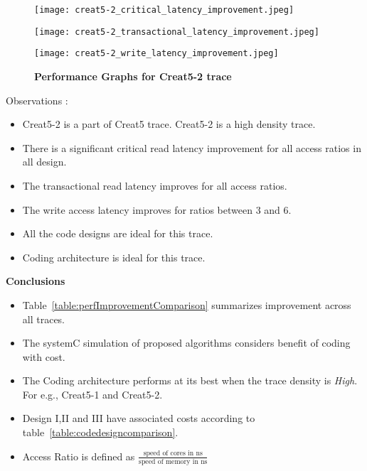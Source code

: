\begin{landscape}
\cleardoublepage
\begin{figure}[htb]
	\centering
\begin{minipage}[!t]{0.32\linewidth}
        \texttt{[image: creat5-2\_critical\_latency\_improvement.jpeg]}
\end{minipage}
\begin{minipage}[!t]{0.32\linewidth}
        \texttt{[image: creat5-2\_transactional\_latency\_improvement.jpeg]}
\end{minipage}
\begin{minipage}[!t]{0.32\linewidth}
        \texttt{[image: creat5-2\_write\_latency\_improvement.jpeg]}
\end{minipage}
\caption{
{\bf Performance Graphs for Creat5-2 trace} }
\label{fig:creat52_improvement}
\end{figure}
Observations : 
\begin{itemize}
	\item Creat5-2 is a part of Creat5 trace. Creat5-2 is a high density trace. 
	\item There is a significant critical read latency improvement for all access ratios in all design. 
	\item The transactional read latency improves for all access ratios.
	\item The write access latency improves for ratios between 3 and 6.
 	\item All the code designs are ideal for this trace. 
	\item Coding architecture is ideal for this trace.
\end{itemize}
\cleardoublepage
{\bf Conclusions}
\begin{itemize}
	\item Table~\ref{table:perfImprovementComparison} summarizes improvement across all traces. 
	\item The systemC simulation of proposed algorithms considers benefit of coding with cost. 
	\item The Coding architecture performs at its best when the trace density is {\em High}. For e.g., Creat5-1 and Creat5-2.
	\item Design I,II and III have associated costs according to table~\ref{table:codedesigncomparison}.
	\item Access Ratio is defined as $\frac{\text{speed of cores in ns}}{\text{speed of memory in ns}}$
\end{itemize}

\end{landscape}
